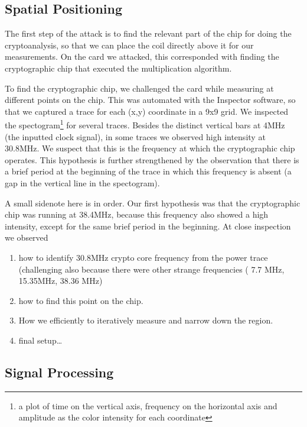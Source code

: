 \documentclass{llncs}
\begin{document}
\subsection{Spatial Positioning}

The first step of the attack is to find the relevant part of the chip for doing the cryptoanalysis, so that we can place the coil directly above it for our measurements. On the card we attacked, this corresponded with finding the cryptographic chip that executed the multiplication algorithm.

To find the cryptographic chip, we challenged the card while measuring at different points on the chip. This was automated with the Inspector software, so that we captured a trace for each (x,y) coordinate in a 9x9 grid. We inspected the spectogram\footnote{a plot of time on the vertical axis, frequency on the horizontal axis and amplitude as the color intensity for each coordinate} for several traces. Besides the distinct vertical bars at 4MHz (the inputted clock signal), in some traces we observed high intensity at 30.8MHz. We suspect that this is the frequency at which the cryptographic chip operates. This hypothesis is further strengthened by the observation that there is a brief period at the beginning of the trace in which this frequency is absent (a gap in the vertical line in the spectogram).

A small sidenote here is in order. Our first hypothesis was that the cryptographic chip was running at 38.4MHz, because this frequency also showed a high intensity, except for the same brief period in the beginning. At close inspection we observed 

\begin{enumerate}
  \item how to identify 30.8MHz crypto core frequency from the power trace (challenging also because there were other strange frequencies ( 7.7 MHz, 15.35MHz, 38.36 MHz)
  \item how to find this point on the chip. 
  \item How we efficiently to iteratively measure and narrow down the region.
  \item final setup\ldots
\end{enumerate}


\subsection{Signal Processing}

\end{document}

